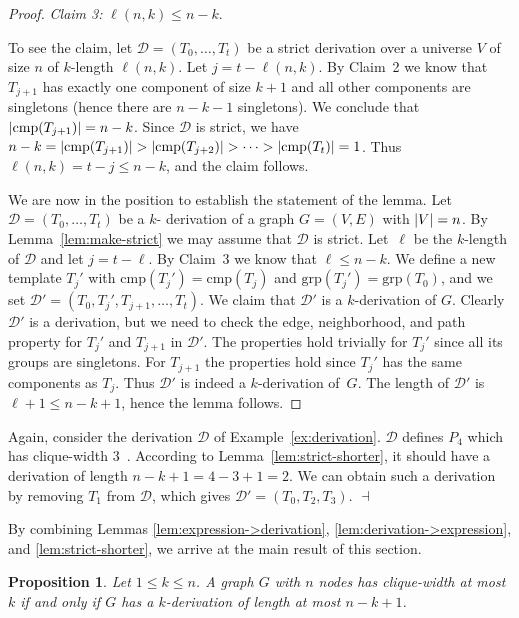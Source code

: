 \documentclass[10pt,usletter]{article}
\newtheorem{proposition}{Proposition}
\theoremstyle{remark}
\newtheorem{example}{Example}
\renewenvironment{example}{\begin{ex}}{\hfill
    $\dashv$\end{ex}\medskip}
\newcommand{\DDD}{\mathcal{D}}
\newcommand{\hy}{\hbox{-}\nobreak\hskip0pt}
\newcommand{\comps}{\text{cmp}}
\newcommand{\groups}{\text{grp}}
\begin{document}
\begin{proof}
  \smallskip\noindent\emph{Claim 3:} $\ell(n,k)\leq n-k$. 

  To see the claim, let $\DDD=(T_0,\dots,T_t)$ be a strict derivation
  over a universe $V$ of size $n$ of $k$\hy length $\ell(n,k)$.  Let
  $j=t-\ell(n,k)$.  By Claim~2 we know that $T_{j+1}$ has exactly one
  component of size $k+1$ and all other components are singletons
  (hence there are $n-k-1$ singletons).  We conclude that
  $\Card{\comps(T_{j+1})}=n-k$. Since $\DDD$ is strict, we have 
  $n-k=\Card{\comps(T_{j+1})}>\Card{\comps(T_{j+2})}>\dots>
  \Card{\comps(T_{t})}=1$. Thus $\ell(n,k)=t-j\leq n-k$, and the claim
  follows.

  \medskip\noindent We are now in the position to establish the
  statement of the lemma.  Let $\DDD=(T_0,\dots,T_t)$ be a $k$\hy
  derivation of a graph $G=(V,E)$ with $|V|=n$. By
  Lemma~\ref{lem:make-strict} we may assume that $\DDD$ is strict.
  Let~$\ell$ be the $k$\hy length of $\DDD$ and let $j=t-\ell$. By
  Claim~3 we know that $\ell\leq n-k$.  We define a new template
  $T_j'$ with $\comps(T_j')=\comps(T_j)$ and
  $\groups(T_j')=\groups(T_0)$, and we set
  $\DDD'=(T_0,T_j',T_{j+1},\dots,T_t)$. We claim that $\DDD'$ is a
  $k$\hy derivation of $G$. Clearly $\DDD'$ is a derivation, but we
  need to check the edge, neighborhood, and path property for $T_j'$
  and $T_{j+1}$ in $\DDD'$. The properties hold trivially for $T_j'$
  since all its groups are singletons. For $T_{j+1}$ the properties
  hold since $T_j'$ has the same components as $T_j$.  Thus $\DDD'$ is
  indeed a $k$\hy derivation of~$G$. The length of $\DDD'$ is
  $\ell+1\leq n-k+1$, hence the lemma follows.
\end{proof}

\begin{example}
  Again, consider the derivation $\DDD$ of Example~\ref{ex:derivation}.
  $\DDD$ defines $P_4$ which has clique-width
  3~\cite{CourcelleOlariu00}.  According to
  Lemma~\ref{lem:strict-shorter}, it should have a derivation of
  length $n - k + 1 = 4 - 3 + 1 = 2$.  We can obtain such a derivation
  by removing $T_1$ from $\DDD$, which gives $\DDD' = (T_0, T_2, T_3)$.
\end{example}

By combining Lemmas \ref{lem:expression->derivation},
\ref{lem:derivation->expression}, and \ref{lem:strict-shorter}, we
arrive at the main result of this section.
\begin{proposition}\label{pro:expression}
  Let $1\leq k \leq n$. A graph $G$ with $n$ nodes has clique-width at
  most $k$ if and only if $G$ has a $k$\hy derivation of length at
  most $n-k+1$.
\end{proposition}
\end{document}
